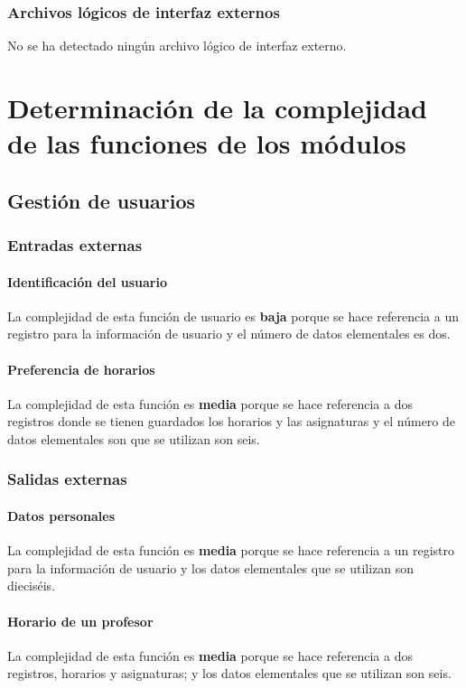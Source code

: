 \documentclass[11pt,a4paper,spanish,twoside]{book}
\begin{document}
\subsection{Archivos lógicos de interfaz externos}
No se ha detectado ningún archivo lógico de interfaz externo.

\chapter[Complejidad de las funciones de los módulos]
{Determinación de la complejidad de las funciones de los  módulos}
\section{Gestión de usuarios}
\subsection{Entradas externas}
\subsubsection{Identificación del usuario}
La complejidad de esta función de usuario es \textbf{baja} porque se hace
referencia a un registro para la información de usuario y el número de datos
elementales es dos. 

\subsubsection{Preferencia de horarios} 
La complejidad de esta función es \textbf{media} porque se hace
referencia a dos registros donde se tienen guardados los horarios y las
asignaturas y el número de datos elementales son que se utilizan son seis. 

\subsection{Salidas externas}
\subsubsection{Datos personales}
La complejidad de esta función es \textbf{media} porque se hace referencia a
un registro para la información de usuario y los datos elementales que se
utilizan son dieciséis.

\subsubsection{Horario de un profesor}
La complejidad de esta función es \textbf{media} porque se hace referencia a
dos registros, horarios y asignaturas; y los datos elementales que
se utilizan son seis.
\end{document}
